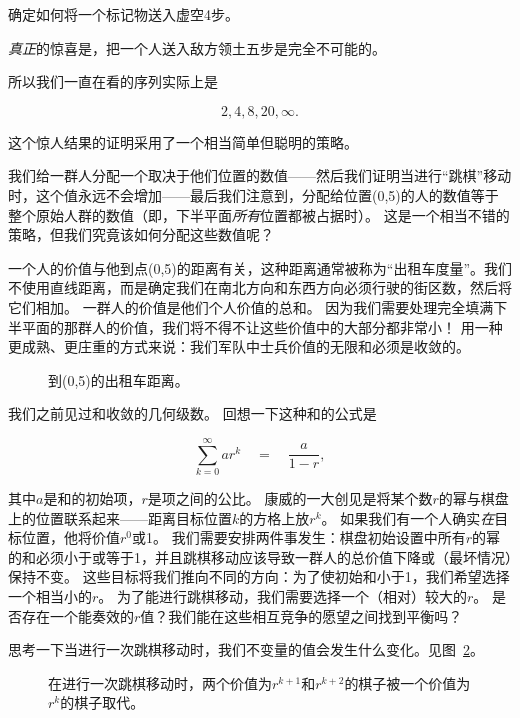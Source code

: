 \begin{exer}
确定如何将一个标记物送入虚空4步。
\end{exer}

\emph{真正}的惊喜是，把一个人送入敌方领土五步是完全不可能的。

所以我们一直在看的序列实际上是

\[ 2, 4, 8, 20, \infty. \] 

这个惊人结果的证明采用了一个相当简单但聪明的策略。

我们给一群人分配一个取决于他们位置的数值——然后我们证明当进行“跳棋”移动时，这个值永远不会增加——最后我们注意到，分配给位置(0,5)的人的数值等于整个原始人群的数值（即，下半平面\emph{所有}位置都被占据时）。
这是一个相当不错的策略，但我们究竟该如何分配这些数值呢？

一个人的价值与他到点(0,5)的距离有关，这种距离通常被称为“出租车度量”。我们不使用直线距离，而是确定我们在南北方向和东西方向必须行驶的街区数，然后将它们相加。
一群人的价值是他们个人价值的总和。
因为我们需要处理完全填满下半平面的那群人的价值，我们将不得不让这些价值中的大部分都非常小！
用一种更成熟、更庄重的方式来说：我们军队中士兵价值的无限和必须是收敛的。

\begin{figure}[!hbtp] 
\begin{center}

\end{center}
\caption[到(0,5)的出租车距离。]{到(0,5)的出租车距离。}
\label{fig:taxicab_distance}
\end{figure}

我们之前见过和收敛的几何级数。
回想一下这种和的公式是

\[ \sum_{k=0}^{\infty} ar^k  \quad = \quad \frac{a}{1-r}, \]

\noindent 其中$a$是和的初始项，$r$是项之间的公比。
康威的一大创见是将某个数$r$的幂与棋盘上的位置联系起来——距离目标位置$k$的方格上放$r^k$。
如果我们有一个人确实\emph{在}目标位置，他将价值$r^0$或1。
我们需要安排两件事发生：棋盘初始设置中所有$r$的幂的和必须小于或等于1，并且跳棋移动应该导致一群人的总价值下降或（最坏情况）保持不变。
这些目标将我们推向不同的方向：为了使初始和小于1，我们希望选择一个相当小的$r$。
为了能进行跳棋移动，我们需要选择一个（相对）较大的$r$。
是否存在一个能奏效的$r$值？我们能在这些相互竞争的愿望之间找到平衡吗？

思考一下当进行一次跳棋移动时，我们不变量的值会发生什么变化。见图~\ref{fig:finding_r}。

\begin{figure}[!hbtp] 
\begin{center}

\end{center}
\caption[寻找r。]{在进行一次跳棋移动时，两个价值为$r^{k+1}$和$r^{k+2}$的棋子被一个价值为$r^k$的棋子取代。}
\label{fig:finding_r}
\end{figure}

